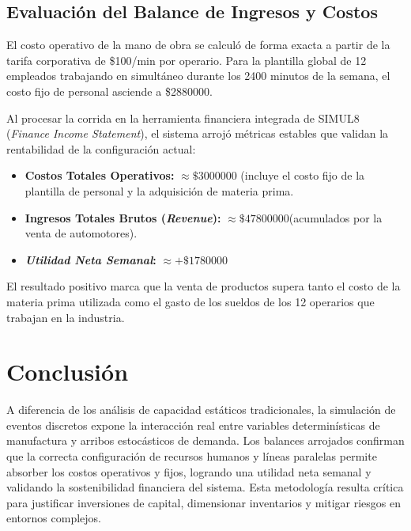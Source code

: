 \documentclass[11pt,a4paper]{article}
\begin{document}
\subsection{Evaluación del Balance de Ingresos y Costos}
El costo operativo de la mano de obra se calculó de forma exacta a partir de la tarifa corporativa de \$100/min por operario. Para la plantilla global de 12 empleados trabajando en simultáneo durante los 2400 minutos de la semana, el costo fijo de personal asciende a \$2880000. 

Al procesar la corrida en la herramienta financiera integrada de SIMUL8 (\textit{Finance Income Statement}), el sistema arrojó métricas estables que validan la rentabilidad de la configuración actual:
\begin{itemize}
    \item \textbf{Costos Totales Operativos:} $\approx \$3000000$ (incluye el costo fijo de la plantilla de personal y la adquisición de materia prima.
    \item \textbf{Ingresos Totales Brutos (\textit{Revenue}):} $\approx \$47800000$(acumulados por la venta de automotores).
    \item \textbf{\textit{Utilidad Neta Semanal}:} $\approx +\$1780000$
\end{itemize}

El resultado positivo marca que la venta de productos supera tanto el costo de la materia prima utilizada como el gasto de los sueldos de los 12 operarios que trabajan en la industria. 

\section{Conclusión}
A diferencia de los análisis de capacidad estáticos tradicionales, la simulación de eventos discretos expone la interacción real entre variables determinísticas de manufactura y arribos estocásticos de demanda. Los balances arrojados confirman que la correcta configuración de recursos humanos y líneas paralelas permite absorber los costos operativos y fijos, logrando una utilidad neta semanal y validando la sostenibilidad financiera del sistema. Esta metodología resulta crítica para justificar inversiones de capital, dimensionar inventarios y mitigar riesgos en entornos complejos.
\end{document}
